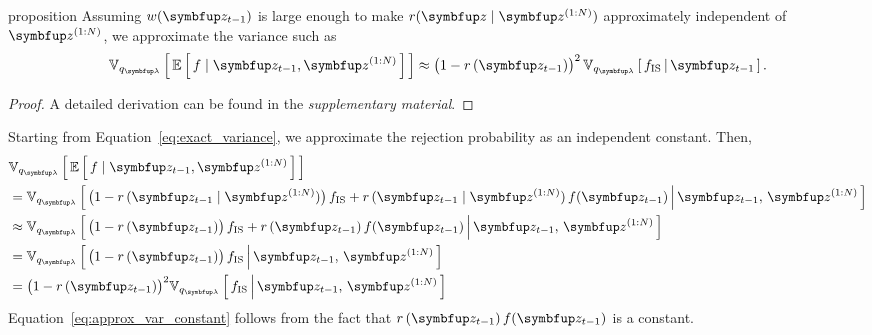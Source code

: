
\begin{theoremEnd}{proposition}\label{thm:approx_var}
  Assuming \(w(\vz_{t-1})\) is large enough to make \(r(\vz\mid\vz^{(1:N)})\) approximately independent of \(\vz^{(1:N)}\), we approximate the variance such as
  \begin{align}
    \Vsub{q_{\vlambda}}{ \E{ f \mid \vz_{t-1}, \vz^{(1:N)} } } \approx {\big(1 - r\,(\vz_{t-1})\big)}^2\,\Vsub{q_{\vlambda}}{ f_{\text{IS}} \,\middle\vert\, \vz_{t-1} }.
  \end{align}
\end{theoremEnd}
\begin{proof}
  A detailed derivation can be found in the \textit{supplementary material}.
\end{proof}
\begin{proofEnd}
  Starting from Equation~\eqref{eq:exact_variance}, we approximate the rejection probability as an independent constant.
  Then,
  \begin{align}
    &\Vsub{q_{\vlambda}}{ \E{ f \mid \vz_{t-1}, \vz^{(1:N)} } } \\
    &= \Vsub{q_{\vlambda}}{ \big(1 - r\,(\vz_{t-1}\mid\vz^{(1:N)})\big)\, f_{\mathrm{IS}}
      + r\,(\vz_{t-1}\mid\vz^{(1:N)})\,f(\vz_{t-1}) \,\middle\vert\, \vz_{t-1},\, \vz^{(1:N)} } \\
    &\approx \Vsub{q_{\vlambda}}{ \big(1 - r\,(\vz_{t-1})\big)\, f_{\mathrm{IS}}
      + r\,(\vz_{t-1})\,f(\vz_{t-1}) \,\middle\vert\, \vz_{t-1},\, \vz^{(1:N)} } \\
    &= \Vsub{q_{\vlambda}}{ \big(1 - r\,(\vz_{t-1})\big)\, f_{\mathrm{IS}} \,\middle\vert\, \vz_{t-1},\, \vz^{(1:N)} } \label{eq:approx_var_constant} \\
    &= {\big(1 - r\,(\vz_{t-1})\big)}^2 \Vsub{q_{\vlambda}}{ f_{\mathrm{IS}} \,\middle\vert\, \vz_{t-1},\, \vz^{(1:N)} } \label{eq:approx_var_linear} 
  \end{align}
  Equation~\eqref{eq:approx_var_constant} follows from the fact that \(r\,(\vz_{t-1})\,f(\vz_{t-1})\) is a constant.
\end{proofEnd}

